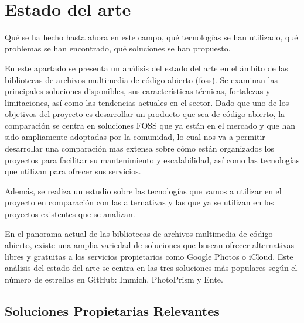 \newpage
~
\newpage
\section{Estado del arte}
Qué se ha hecho hasta ahora en este campo, qué tecnologías se han utilizado, qué problemas se han encontrado, qué soluciones se han propuesto.

%
%


En este apartado se presenta un análisis del estado del arte en el ámbito de las bibliotecas de archivos multimedia de código abierto (\acrshort{foss}).
Se examinan las principales soluciones disponibles, sus características técnicas, fortalezas y limitaciones, así como las tendencias actuales en el sector.
Dado que uno de los objetivos del proyecto es desarrollar un producto que sea de código abierto, la comparación se centra en soluciones FOSS que ya están en el mercado y que han sido ampliamente adoptadas por la comunidad, lo cual nos va a permitir desarrollar una comparación mas extensa sobre cómo están organizados los proyectos para facilitar su mantenimiento y escalabilidad, así como las tecnologías que utilizan para ofrecer sus servicios.

Además, se realiza un estudio sobre las tecnologías que vamos a utilizar en el proyecto en comparación con las alternativas y las que ya se utilizan en los proyectos existentes que se analizan.

En el panorama actual de las bibliotecas de archivos multimedia de código abierto, existe una amplia variedad de soluciones que buscan ofrecer alternativas libres y gratuitas a los servicios propietarios como Google Photos o iCloud. Este análisis del estado del arte se centra en las tres soluciones más populares según el número de estrellas en GitHub: Immich, PhotoPrism y Ente.

\subsection{Soluciones Propietarias Relevantes}

